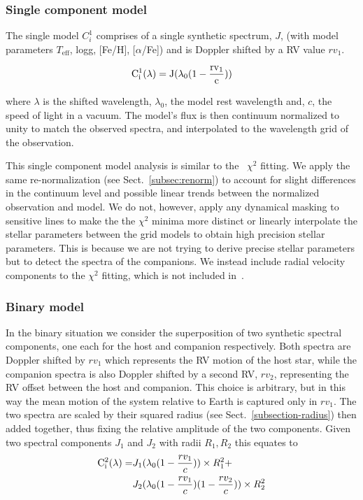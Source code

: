 \documentclass[fleqn,usenatbib]{mnras}
\begin{document}
\subsubsection{Single component model}
\label{subsubsec:single-model}
The single model \(C^{1}_{i}\) comprises of a single synthetic spectrum, \(J\), (with model parameters \(T_{\textrm{eff}}\), logg, [Fe/H], [\(\alpha\)/Fe]) and is Doppler shifted by a RV value \({rv}_1\).

\begin{equation}
\rm C^{1}_{i}(\lambda) = J(\lambda_0(1-\frac{{rv}_1}{c}))
\end{equation}

where \(\lambda\) is the shifted wavelength, \(\lambda_0\), the model rest wavelength and, \(c\), the speed of light in a vacuum. The model's flux is then continuum normalized to unity to match the observed spectra, and interpolated to the wavelength grid of the observation.

This single component model analysis is similar to the~\citet{passegger_fundamental_2016} \(\chi^2\) fitting. We apply the same re-normalization (see Sect.~\ref{subsec:renorm}) to account for slight differences in the continuum level and possible linear trends between the normalized observation and model. We do not, however, apply any dynamical masking to sensitive lines to make the the \(\chi^2\) minima more distinct or linearly interpolate the stellar parameters between the grid models to obtain high precision stellar parameters. This is because we are not trying to derive precise stellar parameters but to detect the spectra of the companions. We instead include radial velocity components to the \(\chi^2\) fitting, which is not included in~\citet{passegger_fundamental_2016}.

\subsubsection{Binary model}
\label{subsubsec:binary-model}
In the binary situation we consider the superposition of two synthetic spectral components, one each for the host and companion respectively. Both spectra are Doppler shifted by \({rv}_1\) which represents the RV motion of the host star, while the companion spectra is also Doppler shifted by a second RV, \({rv}_2\), representing the RV offset between the host and companion. This choice is arbitrary, but in this way the mean motion of the system relative to Earth is captured only in \({rv}_1\). The two spectra are scaled by their squared radius (see Sect.~\ref{subsection-radius}) then added together, thus fixing the relative amplitude of the two components.
Given two spectral components \(J_{1}\) and \(J_{2}\) with radii \(R_1, R_2\) this equates to
\begin{align}
\rm C^{2}_{i}(\lambda) = &  J_{1}(\lambda_{0}(1 - \frac{rv_{1}}{c}))\times R_{1}^2 +\nonumber \\
& J_{2}(\lambda_{0}(1-\frac{rv_{1}}{c})(1-\frac{rv_{2}}{c}))\times R_{2}^2
\end{align}
\end{document}
